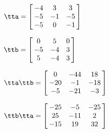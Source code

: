 {$\tta = \left[\hskip -3pt \begin{array}{ccc} -4&3&3\\  -5&-1&-5
\\  -5&0&-1\end{array}\hskip -3pt \right]   $ 

$\ttb =  \left[\hskip -3pt \begin{array}{ccc} 0&5&0\\  -5&-4&3
\\  5&-4&3\end{array}\hskip -3pt \right] $}
{$\tta\ttb = \left[\hskip -3pt \begin{array}{ccc} 0&-44&18\\  -20&-1&-18
\\  -5&-21&-3\end{array}\hskip -3pt \right]$

$\ttb\tta = \left[\hskip -3pt \begin{array}{ccc} -25&-5&-25\\  25&-11&2
\\  -15&19&32\end{array}\hskip -3pt \right]$ }
